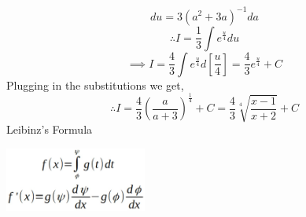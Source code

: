 \documentclass[14pt]{article}
\begin{document}
	\begin{equation*}
		du = 3(a^2+3a)^{-1}da
	\end{equation*}
	\begin{equation*}
		\therefore I = \frac{1}{3}\int e^{\frac{u}{4}} du
	\end{equation*}
	\begin{equation*}
		\implies I = \frac{4}{3} \int e^{\frac{u}{4}} d[\frac{u}{4}] = \frac{4}{3} e^{\frac{u}{4}} + C
	\end{equation*}
	Plugging in the substitutions we get,
	\begin{equation*}
		\therefore I = \frac{4}{3} (\frac{a}{a+3})^{\frac{1}{4}} +C=\boxed{\frac{4}{3} \sqrt[4]{\frac{x-1}{x+2}} +C}
	\end{equation*}
	Leibinz's Formula
	\begin{center}		%
		\includegraphics[width=0.35\textwidth]{"./Pictures/LeiBinz.png"} %
	\end{center}
\end{document}
